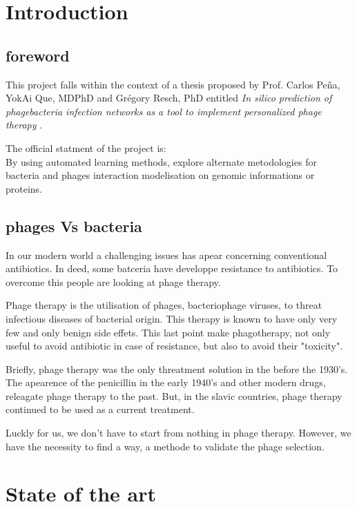 \documentclass[a4paper,11pt]{report}
\begin{document}
\tableofcontents


\chapter{Introduction}
\section{foreword}
This project falls within the context of a thesis proposed by Prof. Carlos Peña, YokAi
Que, MDPhD and Grégory Resch, PhD entitled \textit{In silico prediction of phagebacteria
infection networks as a tool to implement personalized phage therapy} \cite{ref1}.

The official statment of the project is:\\
By using automated learning methods, explore alternate metodologies for bacteria and phages interaction modelisation on genomic informations or proteins.


\section{phages Vs bacteria}
In our modern world a challenging issues has apear concerning conventional antibiotics. In deed, some batceria have developpe resistance to antibiotics. To overcome this people are looking at phage therapy. 

Phage therapy is the utilisation of phages, bacteriophage viruses, to threat infectious diseases of bacterial origin. This therapy is known to have only very few and only benign side effets. This last point make phagotherapy, not only useful to avoid antibiotic in case of resistance, but also to avoid their "toxicity".

Briefly, phage therapy was the only threatment solution in the before the 1930's. The apearence of the penicillin in the early 1940's and other modern drugs, releagate phage therapy to the past. But, in the slavic countries, phage therapy continued to be used as a current treatment.

Luckly for us, we don't have to start from nothing in phage therapy. However, we have the necessity to find a way, a methode to validate the phage selection. \cite{ref2}




\chapter{State of the art}
\end{document}
